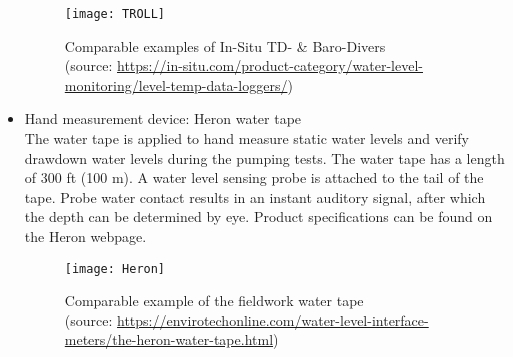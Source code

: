 \begin{itemize}
\begin{figure}[h!]
 \centering\texttt{[image: TROLL]}
 \captionsetup{justification=centering}
 \caption[Comparable examples of In-Situ TD- \& Baro-Divers]{Comparable examples of In-Situ TD- \& Baro-Divers \\ (source: \url{https://in-situ.com/product-category/water-level-monitoring/level-temp-data-loggers/})}
 \label{fig:TROLL}
\end{figure}

\item Hand measurement device: Heron water tape \\
The water tape is applied to hand measure static water levels and verify drawdown water levels during the pumping tests. The water tape has a length of 300 ft (100 m). A water level sensing probe is attached to the tail of the tape. Probe water contact results in an instant auditory signal, after which the depth can be determined by eye. Product specifications can be found on the Heron webpage.

\begin{figure}[h!]
 \centering\texttt{[image: Heron]}
 \captionsetup{justification=centering}
 \caption[Comparable example of the fieldwork water tape]{Comparable example of the fieldwork water tape \\ (source: \url{https://envirotechonline.com/water-level-interface-meters/the-heron-water-tape.html})}
 \label{fig:Heron}
\end{figure}

\end{itemize}